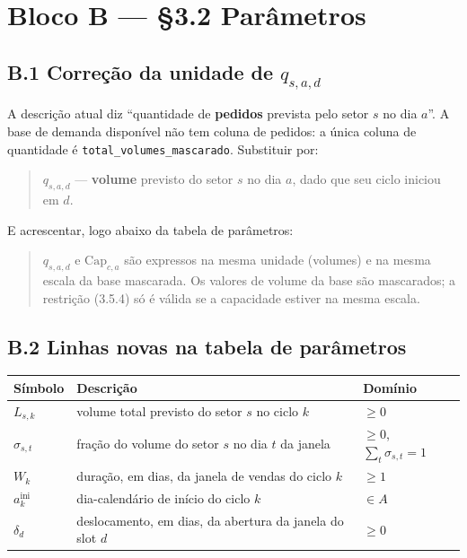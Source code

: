 \documentclass[11pt]{article}
\begin{document}
\section*{Bloco B — §3.2 Parâmetros}

\subsection*{B.1 Correção da unidade de $q_{s,a,d}$}

A descrição atual diz ``quantidade de \textbf{pedidos} prevista pelo setor
$s$ no dia $a$''. A base de demanda disponível não tem coluna de pedidos:
a única coluna de quantidade é \texttt{total\_volumes\_mascarado}.
Substituir por:

\begin{quote}
$q_{s,a,d}$ — \textbf{volume} previsto do setor $s$ no dia $a$, dado que
seu ciclo iniciou em $d$.
\end{quote}

\noindent E acrescentar, logo abaixo da tabela de parâmetros:

\begin{quote}
$q_{s,a,d}$ e $\mathrm{Cap}_{c,a}$ são expressos na mesma unidade
(volumes) e na mesma escala da base mascarada. Os valores de volume da
base são mascarados; a restrição (3.5.4) só é válida se a capacidade
estiver na mesma escala.
\end{quote}

\subsection*{B.2 Linhas novas na tabela de parâmetros}

\begin{center}
\begin{tabular}{@{}lll@{}}
\toprule
Símbolo & Descrição & Domínio \\
\midrule
$L_{s,k}$ & volume total previsto do setor $s$ no ciclo $k$ & $\ge 0$ \\
$\sigma_{s,t}$ & fração do volume do setor $s$ no dia $t$ da janela &
  $\ge 0$, $\sum_t \sigma_{s,t} = 1$ \\
$W_k$ & duração, em dias, da janela de vendas do ciclo $k$ & $\ge 1$ \\
$a^{\mathrm{ini}}_k$ & dia-calendário de início do ciclo $k$ & $\in A$ \\
$\delta_d$ & deslocamento, em dias, da abertura da janela do slot $d$ & $\ge 0$ \\
\bottomrule
\end{tabular}
\end{center}
\end{document}
